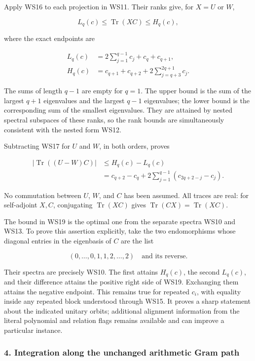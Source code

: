 Apply WS16 to each projection in WS11. Their ranks give, for \(X=U\) or \(W\),

\[
L_q(c)\le\operatorname{Tr}(XC)\le H_q(c),
\tag{WS17}
\]

where the exact endpoints are

\[
\begin{aligned}
L_q(c)&=2\sum_{j=1}^{q-1}c_j+c_q+c_{q+1},\\
H_q(c)&=c_{q+1}+c_{q+2}
       +2\sum_{j=q+3}^{2q+1}c_j.
\end{aligned}
\tag{WS18}
\]

The sums of length \(q-1\) are empty for \(q=1\). The upper bound is the sum of the largest \(q+1\) eigenvalues and the largest \(q-1\) eigenvalues; the lower bound is the corresponding sum of the smallest eigenvalues. They are attained by nested spectral subspaces of these ranks, so the rank bounds are simultaneously consistent with the nested form WS12.

Subtracting WS17 for \(U\) and \(W\), in both orders, proves

\[
\boxed{
\begin{aligned}
\left|\operatorname{Tr}((U-W)C)\right|
&\le H_q(c)-L_q(c)\\
&=c_{q+2}-c_q
 +2\sum_{j=1}^{q-1}(c_{2q+2-j}-c_j).
\end{aligned}}
\tag{WS19}
\]

No commutation between \(U\), \(W\), and \(C\) has been assumed. All traces are real: for self-adjoint \(X,C\), conjugating \(\operatorname{Tr}(XC)\) gives \(\operatorname{Tr}(CX)=\operatorname{Tr}(XC)\).

The bound in WS19 is the optimal one from the separate spectra WS10 and WS13. To prove this assertion explicitly, take the two endomorphisms whose diagonal entries in the eigenbasis of \(C\) are the list

\[
(0,\ldots,0,1,1,2,\ldots,2)
\quad\text{and its reverse}.
\tag{WS20}
\]

Their spectra are precisely WS10. The first attains \(H_q(c)\), the second \(L_q(c)\), and their difference attains the positive right side of WS19. Exchanging them attains the negative endpoint. This remains true for repeated \(c_i\), with equality inside any repeated block understood through WS15. It proves a sharp statement about the indicated unitary orbits; additional alignment information from the literal polynomial and relation flags remains available and can improve a particular instance.

\subsubsection{4. Integration along the unchanged arithmetic Gram path}\label{endpoint-window_review--integration-along-the-unchanged-arithmetic-gram-path}

